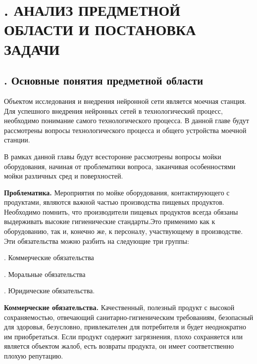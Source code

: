 \setcounter{chaptercntr}{1}

\sectionbreak \section*{
  \gostTitleFont
  \redline
  \thechaptercntr .
  АНАЛИЗ ПРЕДМЕТНОЙ ОБЛАСТИ И ПОСТАНОВКА ЗАДАЧИ
}

\titlespace

\subsection*{ 
  \gostTitleFont
  \redline
  \thechaptercntr .\thesubchaptercntr \spc 
  Основные понятия предметной области
} \addtocounter{subchaptercntr}{1}

\subtitlespace

{\gostFont

\par \redline Объектом исследования и внедрения нейронной сети является моечная станция. Для успешного внедрения нейронных сетей в технологический процесс, необходимо понимание самого технологического процесса. В данной главе будут рассмотрены вопросы технологического процесса и общего устройства моечной станции. 

\par \redline В рамках данной главы будут всесторонне рассмотрены вопросы мойки оборудования, начиная от проблематики вопроса, заканчивая особенностями мойки различных сред и поверхностей.


\par \redline  \textbf{Проблематика.} Мероприятия по мойке оборудования, контактирующего с продуктами, являются важной частью производства пищевых продуктов. Необходимо помнить, что производители пищевых продуктов всегда обязаны выдерживать высокие гигиенические стандарты.Это применимо как к оборудованию, так и, конечно же, к персоналу, участвующему	в производстве. Эти обязательства можно разбить на следующие три группы:



\par {}. Коммерческие обязательства
\par {}. Моральные обязательства
\par {}. Юридические обязательства.


\par \redline \textbf{Коммерческие обязательства.} Качественный, полезный продукт с высокой сохраняемостью, отвечающий санитарно-гигиеническим требованиям, безопасный для здоровья, безусловно, привлекателен для потребителя и будет неоднократно им приобретаться. Если продукт содержит загрязнения, плохо сохраняется или является объектом жалоб, есть возвраты продукта, он имеет соответственно плохую репутацию.

}
